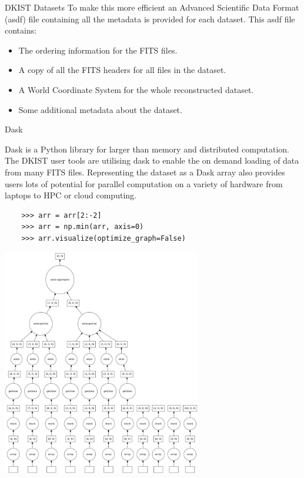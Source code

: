\documentclass[a0paper,landscape,fontscale=0.3]{baposter}
\begin{document}
\begin{poster}
\begin{posterbox}[name=dataset,column=0,row=0,span=1,below=intro]{DKIST Datasets}
  To make this more efficient an Advanced Scientific Data Format (asdf) file
  containing all the metadata is provided for each dataset. This asdf file
  contains:
  \begin{itemize}
    \item The ordering information for the FITS files.
    \item A copy of all the FITS headers for all files in the dataset.
    \item A World Coordinate System for the whole reconstructed dataset.
    \item Some additional metadata about the dataset.
  \end{itemize}
  
\end{posterbox}

\begin{posterbox}[name=dask,column=1,row=0,span=1,below=intro]{Dask}
  
  Dask is a Python library for larger than memory and distributed computation.
  The DKIST user tools are utilising dask to enable the on demand loading of data
  from many FITS files. Representing the dataset as a Dask array also provides
  users lots of potential for parallel computation on a variety of hardware from
  laptops to HPC or cloud computing.
  
  \begin{verbatim}
    >>> arr = arr[2:-2]
    >>> arr = np.min(arr, axis=0)
    >>> arr.visualize(optimize_graph=False)
  \end{verbatim}

  \begin{center}
    \includegraphics[width=0.65\textwidth]{mydask.png}
  \end{center}


\end{posterbox}
\end{poster}
\end{document}
